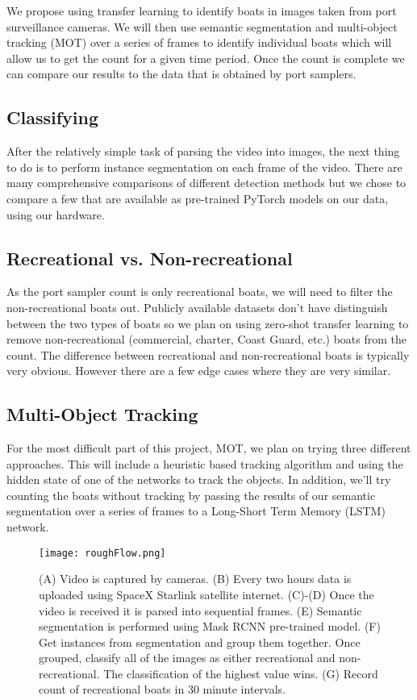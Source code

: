 \documentclass[10pt,twocolumn,letterpaper]{article}
\begin{document}
We propose using transfer learning to identify boats in images taken from port surveillance cameras. We will then use semantic segmentation and multi-object tracking (MOT) over a series of frames to identify individual boats which will allow us to get the count for a given time period. Once the count is complete we can compare our results to the data that is obtained by port samplers.

\subsection{Classifying}

After the relatively simple task of parsing the video into images, the next thing to do is to perform instance segmentation on each frame of the video. There are many comprehensive comparisons of different detection methods \cite{pytorch_models} but we chose to compare a few that are available as pre-trained PyTorch models on our data, using our hardware.

\subsection{Recreational vs. Non-recreational}

 As the port sampler count is only recreational boats, we will need to filter the non-recreational boats out. Publicly available datasets don't have distinguish between the two types of boats so we plan on using zero-shot transfer learning to remove non-recreational (commercial, charter, Coast Guard, etc.) boats from the count. The difference between recreational and non-recreational boats is typically very obvious. However there are a few edge cases where they are very similar.

\subsection{Multi-Object Tracking}

For the most difficult part of this project, MOT, we plan on trying three different approaches. This will include a heuristic based tracking algorithm and using the hidden state of one of the networks to track the objects. In addition, we'll try counting the boats without tracking by passing the results of our semantic segmentation over a series of frames to a Long-Short Term Memory (LSTM) network.

\begin{figure*}[t]
  \centering
    \texttt{[image: roughFlow.png]}
    \caption{(A) Video is captured by cameras. (B) Every two hours data is uploaded using SpaceX Starlink satellite internet. (C)-(D) Once the video is received it is parsed into sequential frames. (E) Semantic segmentation is performed using Mask RCNN pre-trained model. (F) Get instances from segmentation and group them together. Once grouped, classify all of the images as either recreational and non-recreational. The classification of the highest value wins. (G) Record count of recreational boats in 30 minute intervals.}
    \label{fig:pipline}
  \hfill
\end{figure*}
\end{document}
